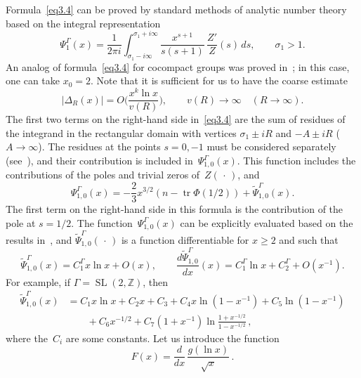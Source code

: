 \documentclass{amsart}
\theoremstyle{plain}
\theoremstyle{definition}
\numberwithin{equation}{section}
\begin{document}
Formula~\eqref{eq3.4} can be proved by standard methods of analytic
number theory based on the integral representation~\cite{15}
$$
\Psi_1^\Gamma(x)=\frac{1}{2\pi i}\int_{\sigma_1-i\infty}^{\sigma_1+i\infty}
\frac{x^{s+1}}{s(s+1)}\,\frac{Z'}{Z}(s)\,ds,\qquad
\sigma_1>1.
$$
An analog of formula~\eqref{eq3.4} for cocompact groups was proved
in~\cite{15}; in this case, one can take $x_0=2$. Note that it is
sufficient for us to have the coarse estimate
\begin{equation}
 \label{eq3.9}
|\Delta_R(x)|=O\biggl(\frac{x^k\ln x}{v(R)}\biggr),\qquad
v(R)\to\infty\quad (R\to\infty).
\end{equation}
The first two terms on the right-hand side in~\eqref{eq3.4} are the
sum of residues of the integrand in the rectangular domain with
vertices $\sigma_1\pm iR$ and $-A\pm iR$ ($A\to\infty$). The
residues at the points $s=0,-1$ must be considered separately
(see~\cite{15}), and their contribution is included
in~$\Psi_{1,0}^\Gamma(x)$. This function includes the contributions
of the poles and trivial zeros of~$Z(\,\cdot\,)$, and
\begin{equation}
\label{eq3.10}
\Psi^\Gamma_{1,0}(x)=-\frac{2}{3}x^{3/2}(n-\operatorname{tr}\Phi(1/2))+
\widetilde\Psi^\Gamma_{1,0}(x).
\end{equation}
The first term on the right-hand side in this formula is the
contribution of the pole at $s=1/2$. The
function~$\Psi^\Gamma_{1,0}(x)$ can be explicitly evaluated based
on the results in~\cite{1,12}, and
$\widetilde\Psi^\Gamma_{1,0}(\,\cdot\,)$ is a function
differentiable for $x\geqslant2$ and such that
\begin{equation}
\widetilde\Psi^\Gamma_{1,0}(x)=C_1^\Gamma x\ln x+O(x),\qquad
\frac{d\widetilde\Psi_{1,0}^\Gamma}{dx}(x)=C_1^\Gamma\ln x+
C_2^\Gamma+O(x^{-1}).
\label{eq3.11}
\end{equation}
For example, if $\Gamma=\operatorname{SL}(2,\mathbb{Z})$, then
\begin{align*}
\widetilde\Psi^\Gamma_{1,0}(x)&=C_1x\ln x+C_2x+C_3+C_4x\ln(1-x^{-1})+
C_5\ln(1-x^{-1})
\\
&\qquad+C_6x^{-1/2}+C_7(1+x^{-1})\ln\frac{1+x^{-1/2}}{1-x^{-1/2}}\,,
\end{align*}
where the~$C_i$ are some constants. Let us introduce the function
\begin{equation}
\label{eq3.12}
F(x)=\frac{d}{dx}\,\frac{g(\ln x)}{\sqrt{x}}\,.
\end{equation}
\end{document}
